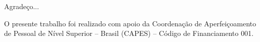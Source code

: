 Agradeço...

O presente trabalho foi realizado com apoio da Coordenação de Aperfeiçoamento de Pessoal de Nível Superior – Brasil (CAPES) – Código de Financiamento 001.
